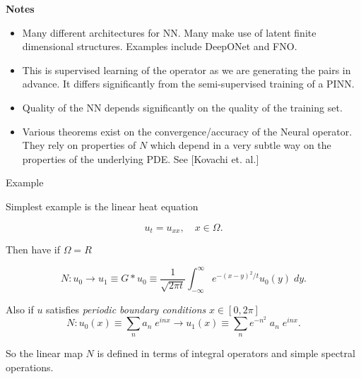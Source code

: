 \documentclass{beamer}
\begin{document}
\begin{frame}

{\bf Notes} 

\begin{itemize}

\item Many different architectures for NN. Many make use of latent {\color{blue} finite dimensional} structures. Examples include {\color{blue} DeepONet and FNO. }


\item This is {\color{blue} supervised learning of the operator} as we are generating the pairs in advance. {\color{red} It differs significantly from the semi-supervised training of a PINN.}

\item Quality of the NN depends significantly on the quality of the training set. 

\item Various theorems exist on the convergence/accuracy of the Neural operator. They rely on properties of $N$ which depend in a very subtle way on the properties of the underlying PDE. See [Kovachi et. al.]

\end{itemize}


\end{frame}


\begin{frame}{Example}

Simplest example is the {\color{blue} linear heat equation}

$$u_t = u_{xx}, \quad x \in \Omega.$$

Then have if $\Omega = R$

$$N: u_0 \to  u_1 \equiv G* u_0 \equiv \frac{1}{\sqrt{2 \pi t}} \int_{-\infty}^{\infty} e^{-(x-y)^2/t} u_0(y) \; dy.$$

\vspace{0.1in}

Also if $u$ satisfies {\color{blue} {\em periodic boundary conditions}} $x \in [0,2\pi]$  
$$N : u_0(x) \equiv \sum_{n} a_n \; e^{i n x} \to  u_1(x) \equiv \sum_{n} e^{-n^2} \; a_n \; e^{i n x} .$$

\vspace{0.1in}

So the linear map $N$ is defined in terms of {\color{blue} integral operators} and {\color{blue} simple spectral operations. }

\end{frame}
\end{document}
